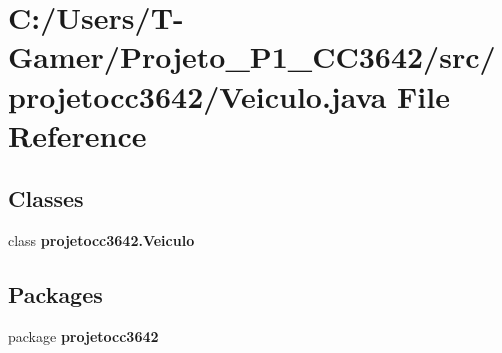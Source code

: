 \section{C\+:/\+Users/\+T-\/\+Gamer/\+Projeto\+\_\+\+P1\+\_\+\+C\+C3642/src/projetocc3642/\+Veiculo.java File Reference}
\label{_veiculo_8java}
\subsection*{Classes}
\begin{DoxyCompactItemize}
\item 
class \textbf{ projetocc3642.\+Veiculo}
\end{DoxyCompactItemize}
\subsection*{Packages}
\begin{DoxyCompactItemize}
\item 
package \textbf{ projetocc3642}
\end{DoxyCompactItemize}
